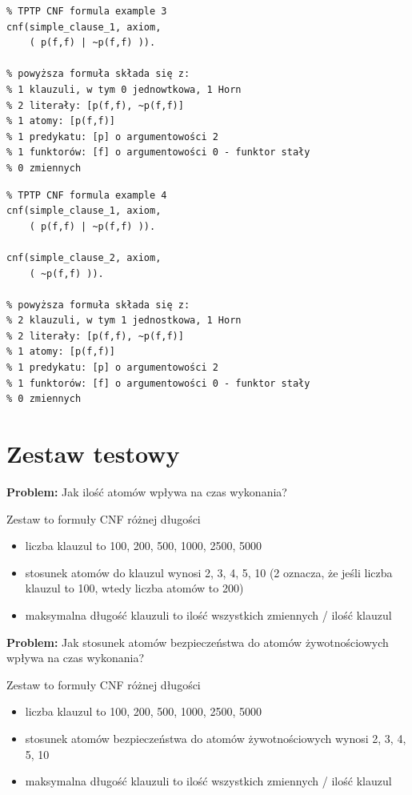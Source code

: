 \documentclass[a4paper,12pt]{article}
\begin{document}
\begin{verbatim}
% TPTP CNF formula example 3
cnf(simple_clause_1, axiom,
    ( p(f,f) | ~p(f,f) )).

% powyższa formuła składa się z:
% 1 klauzuli, w tym 0 jednowtkowa, 1 Horn
% 2 literały: [p(f,f), ~p(f,f)]
% 1 atomy: [p(f,f)]
% 1 predykatu: [p] o argumentowości 2
% 1 funktorów: [f] o argumentowości 0 - funktor stały
% 0 zmiennych
\end{verbatim}

\begin{verbatim}
% TPTP CNF formula example 4
cnf(simple_clause_1, axiom,
    ( p(f,f) | ~p(f,f) )).

cnf(simple_clause_2, axiom,
    ( ~p(f,f) )).

% powyższa formuła składa się z:
% 2 klauzuli, w tym 1 jednostkowa, 1 Horn
% 2 literały: [p(f,f), ~p(f,f)]
% 1 atomy: [p(f,f)]
% 1 predykatu: [p] o argumentowości 2
% 1 funktorów: [f] o argumentowości 0 - funktor stały
% 0 zmiennych
\end{verbatim}
\newpage
\section{Zestaw testowy}


\noindent
\textbf{Problem:} Jak ilość atomów wpływa na czas wykonania?

Zestaw to formuły CNF różnej długości
\begin{itemize}
  \item liczba klauzul to 100, 200, 500, 1000, 2500, 5000
  \item stosunek atomów do klauzul wynosi 2, 3, 4, 5, 10 (2 oznacza, że jeśli liczba klauzul to 100, wtedy liczba atomów to 200)
  \item maksymalna długość klauzuli to ilość wszystkich zmiennych / ilość klauzul
\end{itemize}

\noindent
\textbf{Problem:} Jak stosunek atomów bezpieczeństwa do atomów żywotnościowych wpływa na czas wykonania?

Zestaw to formuły CNF różnej długości
\begin{itemize}
  \item liczba klauzul to 100, 200, 500, 1000, 2500, 5000
  \item stosunek atomów bezpieczeństwa do atomów żywotnościowych wynosi 2, 3, 4, 5, 10
  \item maksymalna długość klauzuli to ilość wszystkich zmiennych / ilość klauzul
\end{itemize}
\end{document}
